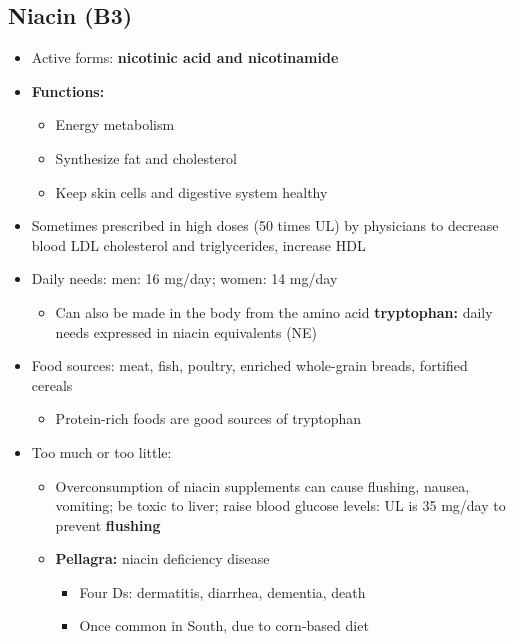 \documentclass[12pt]{article}
\begin{document}
        \subsection{Niacin (B3)}
            \begin{itemize}
                \item Active forms: \textbf{nicotinic acid and nicotinamide}
                \item \textbf{Functions:}
                    \begin{itemize}
                        \item Energy metabolism
                        \item Synthesize fat and cholesterol
                        \item Keep skin cells and digestive system healthy
                    \end{itemize}
                \item Sometimes prescribed in high doses (50 times UL) by physicians to decrease blood LDL cholesterol and triglycerides, increase HDL
                \item Daily needs: men: 16 mg/day; women: 14 mg/day
                    \begin{itemize}
                        \item Can also be made in the body from the amino acid \textbf{tryptophan:} daily needs expressed in niacin equivalents (NE)
                    \end{itemize}
                \item Food sources: meat, fish, poultry, enriched whole-grain breads, fortified cereals
                    \begin{itemize}
                        \item Protein-rich foods are good sources of tryptophan
                    \end{itemize}
                \item Too much or too little:
                    \begin{itemize}
                        \item Overconsumption of niacin supplements can cause flushing, nausea, vomiting; be toxic to liver; raise blood glucose levels: UL is 35 mg/day to prevent \textbf{flushing}
                        \item \textbf{Pellagra:} niacin deficiency disease
                            \begin{itemize}
                                \item Four Ds: dermatitis, diarrhea, dementia, death
                                \item Once common in South, due to corn-based diet
                            \end{itemize}
                    \end{itemize}
            \end{itemize}
\end{document}
